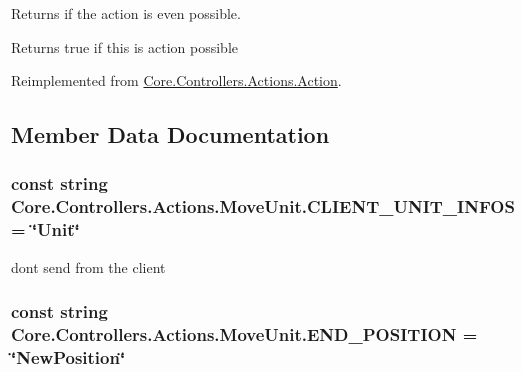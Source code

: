 Returns if the action is even possible. 

\begin{DoxyReturn}{Returns}
true if this is action possible
\end{DoxyReturn}


Reimplemented from \hyperlink{classCore_1_1Controllers_1_1Actions_1_1Action_a405b995343a9394ad19e05a699a4e6d9}{Core.\+Controllers.\+Actions.\+Action}.



\subsection{Member Data Documentation}
\hypertarget{classCore_1_1Controllers_1_1Actions_1_1MoveUnit_ab1ae638f71301aab1dc5fb75162c6dad}{}
\subsubsection[{C\+L\+I\+E\+N\+T\+\_\+\+U\+N\+I\+T\+\_\+\+I\+N\+F\+O\+S}]{\setlength{\rightskip}{0pt plus 5cm}const string Core.\+Controllers.\+Actions.\+Move\+Unit.\+C\+L\+I\+E\+N\+T\+\_\+\+U\+N\+I\+T\+\_\+\+I\+N\+F\+O\+S = \char`\"{}Unit\char`\"{}}\label{classCore_1_1Controllers_1_1Actions_1_1MoveUnit_ab1ae638f71301aab1dc5fb75162c6dad}


don\textquotesingle{}t send from the client 

\hypertarget{classCore_1_1Controllers_1_1Actions_1_1MoveUnit_a411193c1cf0e0784fbc3340dcc3cd21c}{}
\subsubsection[{E\+N\+D\+\_\+\+P\+O\+S\+I\+T\+I\+O\+N}]{\setlength{\rightskip}{0pt plus 5cm}const string Core.\+Controllers.\+Actions.\+Move\+Unit.\+E\+N\+D\+\_\+\+P\+O\+S\+I\+T\+I\+O\+N = \char`\"{}New\+Position\char`\"{}}\label{classCore_1_1Controllers_1_1Actions_1_1MoveUnit_a411193c1cf0e0784fbc3340dcc3cd21c}



